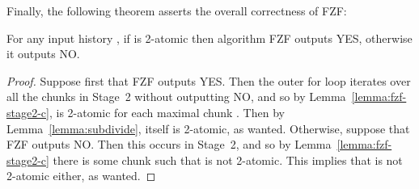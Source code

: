 Finally, the following theorem asserts the overall correctness of FZF:

\begin{theorem}
\label{theorem:fzf-stage2}
For any input history , if  is 2-atomic then algorithm FZF outputs YES, otherwise it outputs NO.
\begin{proof}
Suppose first that FZF outputs YES.
Then the outer for loop iterates over all the chunks in Stage~2 without outputting NO, and so
by Lemma~\ref{lemma:fzf-stage2-c},  is 2-atomic for each maximal chunk .
Then by Lemma~\ref{lemma:subdivide},  itself is 2-atomic, as wanted.
Otherwise, suppose that FZF outputs NO.
Then this occurs in Stage~2, and so by Lemma~\ref{lemma:fzf-stage2-c} there is some chunk
 such that  is not 2-atomic.
This implies that  is not 2-atomic either, as wanted.
\end{proof}
\end{theorem}


